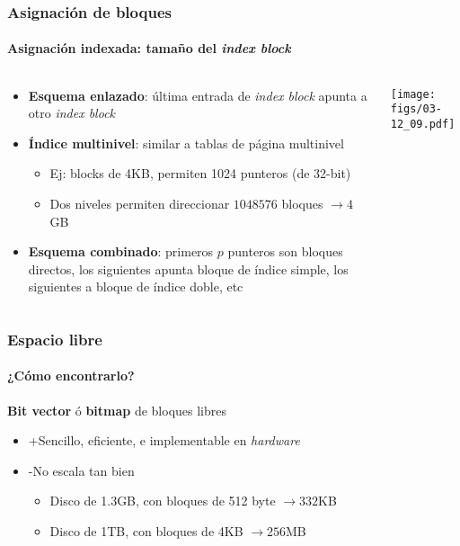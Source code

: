 \documentclass[letter]{beamer}
\begin{document}
\begin{frame}
  \frametitle{Asignación de bloques}
  \framesubtitle{Asignación indexada: tamaño del {\em index block}}

  \begin{columns}[c]
    \begin{column}[T]{6cm}
      \begin{itemize}
        \item {\bf Esquema enlazado}: última entrada de {\em index block} apunta a otro {\em index block}
        \item {\bf Índice multinivel}: similar a tablas de página multinivel
          \begin{itemize}
            \item Ej: blocks de 4KB, permiten 1024 punteros (de 32-bit)
            \item Dos niveles permiten direccionar $1048576$ bloques $\to 4$GB
          \end{itemize}
        \item {\bf Esquema combinado}: primeros $p$ punteros son bloques directos,
              los siguientes apunta bloque de índice simple, los siguientes a bloque 
              de índice doble, etc
      \end{itemize}
    \end{column}
    \begin{column}[T]{5cm}
      \begin{center}
        \texttt{[image: figs/03-12\_09.pdf]}
      \end{center}
    \end{column}
  \end{columns}  

\end{frame}

\begin{frame}
  \frametitle{Espacio libre}
  \framesubtitle{¿Cómo encontrarlo?}

  {\bf Bit vector} ó {\bf bitmap} de bloques libres
  
  \begin{itemize}
    \item +Sencillo, eficiente, e implementable en {\em hardware}
    \item -No escala tan bien
      \begin{itemize}
        \item Disco de 1.3GB, con bloques de 512 byte $\to 332$KB
        \item Disco de 1TB, con bloques de 4KB $\to 256$MB 
      \end{itemize}
  \end{itemize}
\end{frame}
\end{document}
